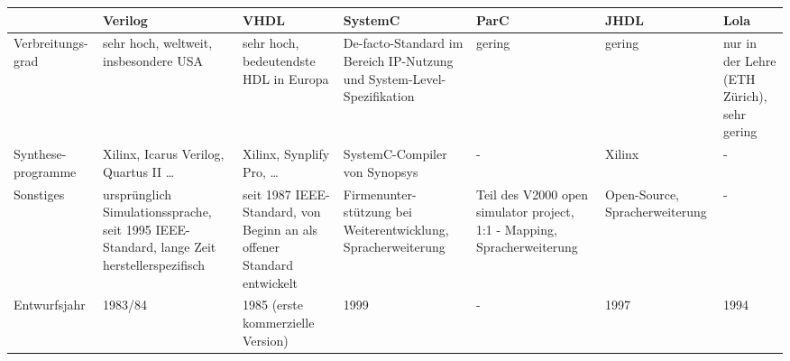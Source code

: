 \documentclass[a4paper, 11pt]{article}
\theoremstyle{definition}
\theoremstyle{plain}
\begin{document}
\begin{landscape}
\begin{tabular}{p{2cm}|p{3cm}|p{3cm}|p{3cm}|p{3cm}|p{3cm}|p{3cm}}
 & \textbf{Verilog} & \textbf{VHDL} & \textbf{SystemC} & \textbf{ParC} & \textbf{JHDL} & \textbf{Lola}\\
\hline 
Verbreitungs- grad & sehr hoch, weltweit, insbesondere USA & sehr hoch, bedeutendste HDL in Europa & De-facto-Standard im Bereich IP-Nutzung und System-Level-
Spezifikation & gering & gering & nur in der Lehre (ETH Zürich), sehr gering\\
\hline
Synthese- programme & Xilinx, Icarus Verilog, Quartus II \ldots & Xilinx, Synplify Pro, \ldots & SystemC-Compiler von Synopsys
 & - & Xilinx & -\\
\hline
Sonstiges & ursprünglich Simulationssprache, seit 1995 IEEE-Standard, lange Zeit herstellerspezifisch & seit 1987 IEEE-Standard, von Beginn an als offener Standard entwickelt & Firmenunter- stützung bei Weiterentwicklung, Spracherweiterung & Teil des V2000 open simulator project, 1:1 - Mapping, Spracherweiterung & Open-Source, Spracherweiterung & - \\
\hline
Entwurfsjahr & 1983/84 & 1985 (erste kommerzielle Version) & 1999 & - & 1997 & 1994
\end{tabular}
\end{landscape}
\end{document}
